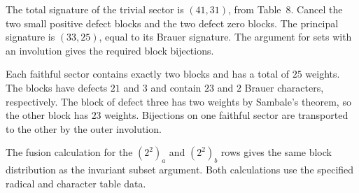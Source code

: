 The total signature of the trivial sector is $(41,31)$, from Table~8. Cancel the two small positive defect blocks and the two defect zero
blocks. The principal signature is $(33,25)$, equal to its Brauer signature.
The argument for sets with an involution gives the required block bijections.

Each faithful sector contains exactly two blocks and has a total of
$25$ weights. The blocks have defects $21$ and $3$ and contain
$23$ and $2$ Brauer characters, respectively.
The block of defect three has two weights by Sambale's theorem,
so the other block has $23$ weights. Bijections on one faithful
sector are transported to the other by the outer involution.

The fusion calculation for the $(2^2)_a$ and $(2^2)_b$ rows gives the same
block distribution as the invariant subset argument. Both calculations use
the specified radical and character table data.

